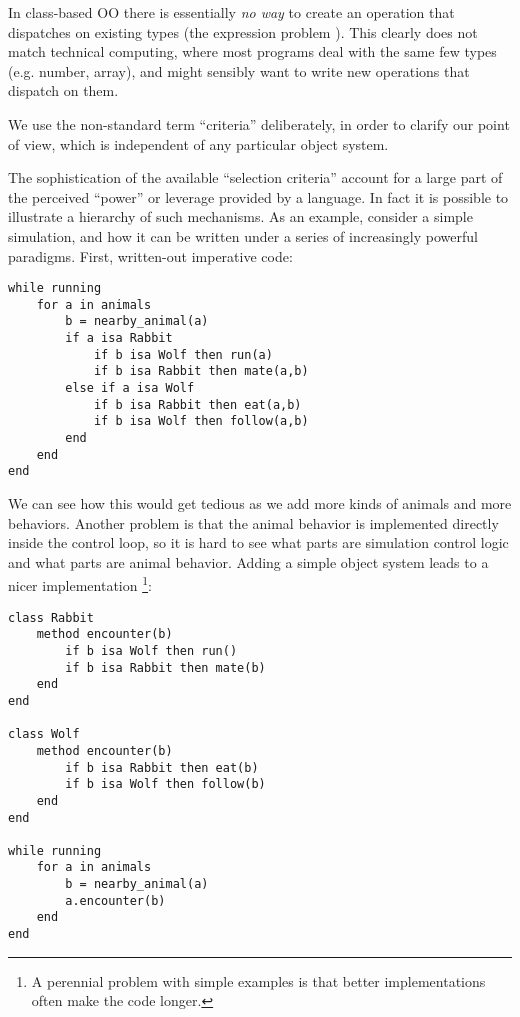 In class-based OO there is essentially \emph{no way} to create an operation
that dispatches on existing types (the expression problem \cite{wadler1998expression}).
This clearly
does not match technical computing, where most programs deal with the same
few types (e.g. number, array), and might sensibly want to write new operations
that dispatch on them.


We use the non-standard term ``criteria'' deliberately, in order
to clarify our point of view, which is independent of any particular
object system.

The sophistication of the available ``selection criteria'' account for a
large part of the perceived ``power'' or leverage provided by a language.
In fact it is possible to illustrate a hierarchy of such mechanisms.
As an example, consider a simple simulation, and how it can be written
under a series of increasingly powerful paradigms. First, written-out
imperative code:

\begin{singlespace}
\begin{verbatim}
while running
    for a in animals
        b = nearby_animal(a)
        if a isa Rabbit
            if b isa Wolf then run(a)
            if b isa Rabbit then mate(a,b)
        else if a isa Wolf
            if b isa Rabbit then eat(a,b)
            if b isa Wolf then follow(a,b)
        end
    end
end
\end{verbatim}
\end{singlespace}

We can see how this would get tedious as we add more kinds of animals
and more behaviors. Another problem is that the animal behavior is
implemented directly inside the control loop, so it is hard to see
what parts are simulation control logic and what parts are animal
behavior. Adding a simple object system leads to a nicer implementation
\footnote{A perennial problem with simple examples is that better
implementations often make the code longer.}:

\begin{singlespace}
\begin{verbatim}
class Rabbit
    method encounter(b)
        if b isa Wolf then run()
        if b isa Rabbit then mate(b)
    end
end

class Wolf
    method encounter(b)
        if b isa Rabbit then eat(b)
        if b isa Wolf then follow(b)
    end
end

while running
    for a in animals
        b = nearby_animal(a)
        a.encounter(b)
    end
end
\end{verbatim}
\end{singlespace}

